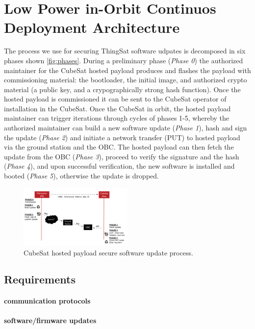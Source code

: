 \section{Low Power in-Orbit Continuos Deployment Architecture}
\label{sec:low-power-orbital-communicaiton-arch}

The process we use for securing ThingSat software udpates is decomposed in six phases shown \autoref{fig:phases}. During a preliminary phase (\textit{Phase 0}) the authorized maintainer for the CubeSat hosted payload
produces and flashes the payload with commissioning material:
the bootloader, the initial image, and authorized crypto material (a public key, and a crypographically strong hash function).
Once the hosted payload is commissioned it can be sent to the CubeSat operator of installation in the CubeSat.
Once the CubeSat in orbit, the hosted payload maintainer can trigger iterations through cycles of phases 1-5, whereby
the authorized maintainer can build a new software update (\textit{Phase 1}), hash
and sign the update (\textit{Phase 2}) and initiate a network transfer (PUT) to hosted payload via the ground station and the OBC. The hosted payload can
then fetch the update from the OBC (\textit{Phase 3}), proceed to verify the signature and the hash (\textit{Phase 4}),
and upon successful verification, the new software is installed and
booted (\textit{Phase 5}), otherwise the update is dropped.

\begin{figure}[t]
    \centering
    \includegraphics[width=0.5\textwidth]{Figures/CubeSat-Payload-update.png}
    \caption{CubeSat hosted payload secure software update process.}
    \label{fig:phases}
\end{figure}


\subsection{Requirements}
\paragraph*{communication protocols}
\paragraph*{software/firmware updates}
